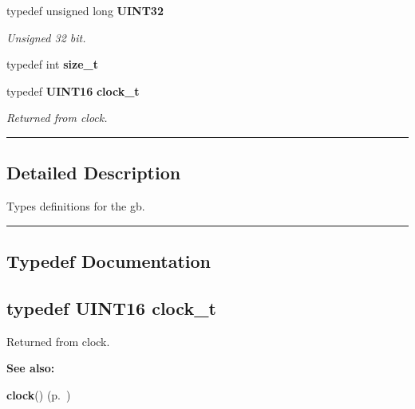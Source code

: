 \begin{CompactItemize}
\item 
\label{asm/gbz80/types.h_a6}
typedef unsigned long {\bf UINT32}
\begin{CompactList}\small\item\em Unsigned 32 bit.\item\end{CompactList}

\item 
\label{asm/gbz80/types.h_a7}
typedef int {\bf size\_\-t}
\item 
typedef {\bf UINT16} {\bf clock\_\-t}
\begin{CompactList}\small\item\em Returned from clock.\item\end{CompactList}

\end{CompactItemize}
\vspace{0.4cm}\hrule\vspace{0.2cm}
\subsection*{Detailed Description}
Types definitions for the gb.\vspace{0.4cm}\hrule\vspace{0.2cm}
\subsection*{Typedef Documentation}
\label{asm/gbz80/types.h_a8}
\subsection{\setlength{\rightskip}{0pt plus 5cm}typedef {\bf UINT16} clock\_\-t}

Returned from clock.

\begin{Desc}
\item[{\bf See also: }]\par
{\bf clock}() {\rm (p.~\pageref{time.h_a1})} \end{Desc}
